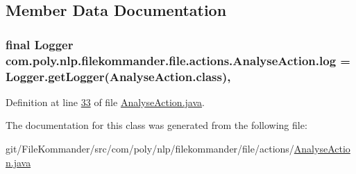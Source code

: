 \subsection{Member Data Documentation}
\hypertarget{classcom_1_1poly_1_1nlp_1_1filekommander_1_1file_1_1actions_1_1_analyse_action_ae99df52b353dd7b0d2014d581fcc8cff}{
\subsubsection[{log}]{\setlength{\rightskip}{0pt plus 5cm}final Logger com.\-poly.\-nlp.\-filekommander.\-file.\-actions.\-Analyse\-Action.\-log = Logger.\-get\-Logger(Analyse\-Action.\-class)\hspace{0.3cm}{\ttfamily [static]}, {\ttfamily [private]}}}\label{classcom_1_1poly_1_1nlp_1_1filekommander_1_1file_1_1actions_1_1_analyse_action_ae99df52b353dd7b0d2014d581fcc8cff}


Definition at line \hyperlink{L33}{33} of file \hyperlink{}{Analyse\-Action.\-java}.



The documentation for this class was generated from the following file\-:\begin{DoxyCompactItemize}
\item 
git/\-File\-Kommander/src/com/poly/nlp/filekommander/file/actions/\hyperlink{_analyse_action_8java}{Analyse\-Action.\-java}\end{DoxyCompactItemize}
